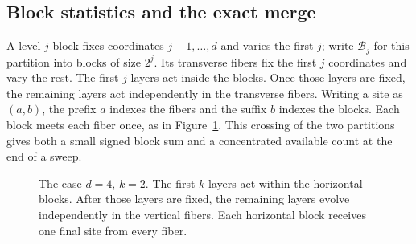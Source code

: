 \subsection{Block statistics and the exact merge}\label{cycles:block-core}

A level-$j$ block fixes coordinates $j+1,\ldots,d$ and varies the
first $j$; write $\mathcal B_j$ for this partition into blocks of size
$2^j$. Its transverse fibers fix the first $j$ coordinates and vary
the rest. The first $j$ layers act inside the blocks. Once those layers
are fixed, the remaining layers act independently in the transverse
fibers. Writing a site as $(a,b)$, the prefix $a$ indexes the
fibers and the suffix $b$ indexes the blocks. Each block meets each
fiber once, as in Figure~\ref{cycles:transverse-figure}. This crossing of the two
partitions gives both a small signed block sum and a concentrated
available count at the end of a sweep.

\begin{figure}[ht]
\centering
{}
\caption{The case $d=4$, $k=2$. The first $k$ layers act within
the horizontal blocks. After those layers are fixed, the remaining
layers evolve independently in the vertical fibers. Each horizontal
block receives one final site from every fiber.}
\label{cycles:transverse-figure}
\end{figure}

